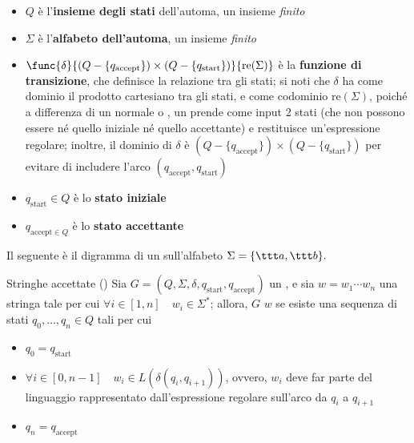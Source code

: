 \documentclass[a4paper, 12pt]{report}
\begin{document}
\begin{frameddefn}[label={def gnfa}]{\GNFA}
        \begin{itemize}
            \item $Q$ è l'\textbf{insieme degli stati} dell'automa, un insieme \textit{finito}
            \item $\Sigma$ è l'\textbf{alfabeto dell'automa}, un insieme \textit{finito}
            \item $\func{\delta}{(Q - \{q_{\mathrm{accept}}\}) \times (Q - \{q_{\mathrm{start}}\})}{\mathrm{re}(\Sigma)}$ è la \textbf{funzione di transizione}, che definisce la relazione tra gli stati; si noti che $\delta$ ha come dominio il prodotto cartesiano tra gli stati, e come codominio $\mathrm{re}(\Sigma)$, poiché a differenza di un normale \DFA o \NFA, un \GNFA prende come input 2 stati (che non possono essere né quello iniziale né quello accettante) e restituisce un'espressione regolare; inoltre, il dominio di $\delta$ è $(Q - \{q_{\mathrm{accept}}\}) \times (Q - \{q_{\mathrm{start}}\})$ per evitare di includere l'arco $(q_{\mathrm{accept}}, q_\mathrm{start})$
            \item $q_{\mathrm{start}} \in Q$ è lo \textbf{stato iniziale}
            \item $q_{\mathrm{accept} \in Q}$ è lo \textbf{stato accettante}
        \end{itemize}
    \end{frameddefn}

    \begin{example}[\GNFA]
        Il seguente è il digramma di un \GNFA sull'alfabeto $\Sigma = \{ \ttt a, \ttt b \}.$

    \end{example}

    \begin{frameddefn}{Stringhe accettate (\GNFA)}
        Sia $G = (Q, \Sigma, \delta, q_{\mathrm{start}}, q_{\mathrm{accept}})$ un \GNFA, e sia $w = w_1\cdots w_n$ una stringa tale per cui $\forall i \in [1, n] \quad w_i \in \Sigma^*$; allora, $G$  $w$ se esiste una sequenza di stati $q_0, \ldots, q_n \in Q$ tali per cui

        \begin{itemize}
            \item $q_0 = q_{\mathrm{start}}$
            \item $\forall i \in [0, n - 1] \quad w_i \in L(\delta(q_i, q_{i + 1}))$, ovvero, $w_i$ deve far parte del linguaggio rappresentato dall'espressione regolare sull'arco da $q_i$ a $q_{i + 1}$
            \item $q_n = q_{\mathrm{accept}}$
        \end{itemize}
    \end{frameddefn}
\end{document}
